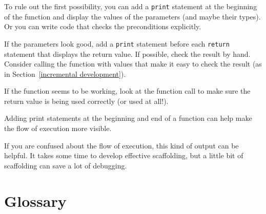 \documentclass[10pt]{book}
\begin{document}
To rule out the first possibility, you can add a {\tt print} statement
at the beginning of the function and display the values of the
parameters (and maybe their types).  Or you can write code
that checks the preconditions explicitly.


If the parameters look good, add a {\tt print} statement before each
{\tt return} statement that displays the return value.  If
possible, check the result by hand.  Consider calling the
function with values that make it easy to check the result
(as in Section~\ref{incremental development}).

If the function seems to be working, look at the function call
to make sure the return value is being used correctly (or used
at all!).


Adding print statements at the beginning and end of a function
can help make the flow of execution more visible.

If you are confused about the flow of execution, this kind of
output can be helpful.  It takes some time to develop effective
scaffolding, but a little bit of scaffolding can save a lot of debugging.


\section{Glossary}
\end{document}
